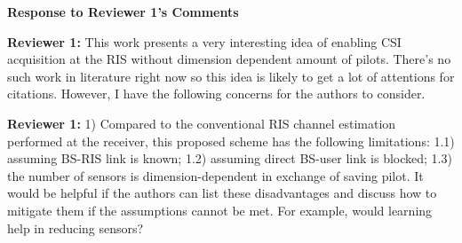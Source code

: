\documentclass[a4paper,12pt]{article}
\begin{document}
\begin{center}
    {\Large\bf Response to Reviewer 1's Comments}
\end{center}

{\textbf{Reviewer 1:}}
This work presents a very interesting idea of enabling CSI acquisition at the RIS without dimension dependent amount of pilots. There's no such work in literature right now so this idea is likely to get a lot of attentions for citations. However, I have the following concerns for the authors to consider. 

{}

\textbf{Reviewer 1:}
1) Compared to the conventional RIS channel estimation performed at the receiver, this proposed scheme has the following limitations: 1.1) assuming BS-RIS link is known; 1.2) assuming direct BS-user link is blocked; 1.3) the number of sensors is dimension-dependent in exchange of saving pilot. It would be helpful if the authors can list these disadvantages and discuss how to mitigate them if the assumptions cannot be met. For example, would learning help in reducing sensors?
\end{document}
